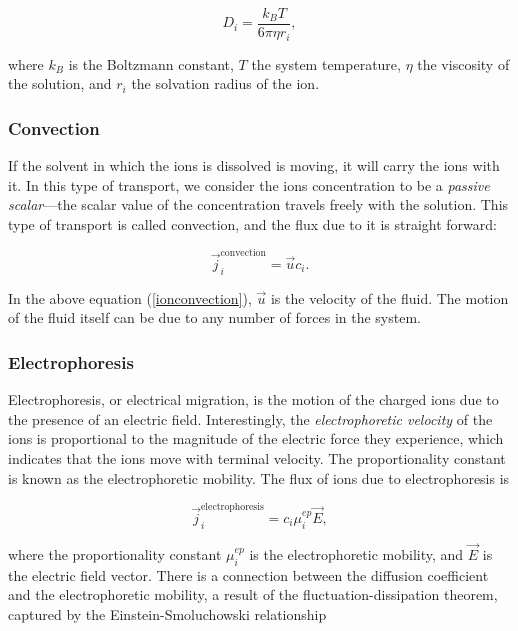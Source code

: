 				\begin{equation} \label{eq:stokeseinstein} \tag{Stokes-Einstein equation}
					D_{i}=\frac{k_{B}T}{6\pi\eta r_{i}},
				\end{equation}
				
				where $k_{B}$ is the Boltzmann constant, $T$ the system temperature, $\eta$ the viscosity of the solution, and $r_{i}$ the solvation radius of the ion.
			
			\subsubsection{Convection}
				If the solvent in which the ions is dissolved is moving, it will carry the ions with it. In this type of transport, we consider the ions concentration to be a \textit{passive scalar}---the scalar value of the concentration travels freely with the solution. This type of transport is called convection, and the flux due to it is straight forward:
				
				\begin{equation} \label{eq:ionconvection} \tag{Ion convection}
					\vec{j}^{\mathrm{convection}}_{i}=\vec{u}c_{i}.
				\end{equation}

				In the above equation (\ref{ionconvection}), $\vec{u}$ is the velocity of the fluid. The motion of the fluid itself can be due to any number of forces in the system.
				
			\subsubsection{Electrophoresis}
				Electrophoresis, or electrical migration, is the motion of the charged ions due to the presence of an electric field. Interestingly, the \textit{electrophoretic velocity} of the ions is proportional to the magnitude of the electric force they experience, which indicates that the ions move with terminal velocity. The proportionality constant is known as the electrophoretic mobility. The flux of ions due to electrophoresis is
				
				\begin{equation} \label{eq:ionelectrophoresis} \tag{Ion electrophoresis}
					\vec{j}^{\mathrm{electrophoresis}}_{i}=c_{i}\mu^{ep}_{i}\vec{E},
				\end{equation}
				
				where the proportionality constant $\mu^{ep}_{i}$ is the electrophoretic mobility, and $\vec{E}$ is the electric field vector. There is a connection between the diffusion coefficient and the electrophoretic mobility, a result of the fluctuation-dissipation theorem, captured by the Einstein-Smoluchowski relationship
				
